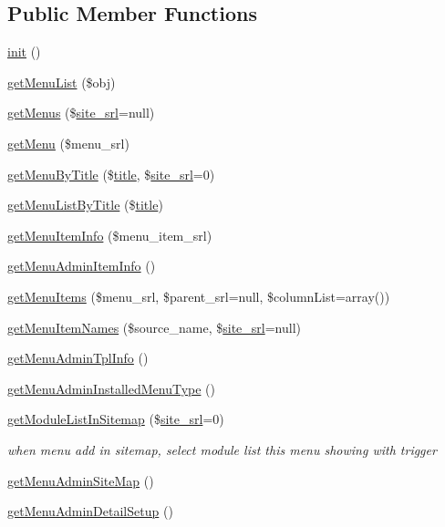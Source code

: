 \subsection*{Public Member Functions}
\begin{DoxyCompactItemize}
\item 
\hyperlink{classmenuAdminModel_a092a0da21ac0c7f76f84ec5be5eea1b7}{init} ()
\item 
\hyperlink{classmenuAdminModel_ad1a73e97dedf1b78f6780e4c17ff5100}{get\+Menu\+List} (\$obj)
\item 
\hyperlink{classmenuAdminModel_a78dfe866b68c04fd622df4d41bdce36c}{get\+Menus} (\$\hyperlink{ko_8install_8php_a8b1406b4ad1048041558dce6bfe89004}{site\+\_\+srl}=null)
\item 
\hyperlink{classmenuAdminModel_a303e32a7d98c99847035407e7ed4e951}{get\+Menu} (\$menu\+\_\+srl)
\item 
\hyperlink{classmenuAdminModel_a358509545ff88093b02be04c6599796d}{get\+Menu\+By\+Title} (\$\hyperlink{ko_8install_8php_a5b072c5fd1d2228c6ba5cee13cd142e3}{title}, \$\hyperlink{ko_8install_8php_a8b1406b4ad1048041558dce6bfe89004}{site\+\_\+srl}=0)
\item 
\hyperlink{classmenuAdminModel_a0639cb89b3292dc5ee8977423b5ac140}{get\+Menu\+List\+By\+Title} (\$\hyperlink{ko_8install_8php_a5b072c5fd1d2228c6ba5cee13cd142e3}{title})
\item 
\hyperlink{classmenuAdminModel_a5686120035966f9a44ec2fea2af191e4}{get\+Menu\+Item\+Info} (\$menu\+\_\+item\+\_\+srl)
\item 
\hyperlink{classmenuAdminModel_a12a02d8f3441f1454fe22e5b8d927de5}{get\+Menu\+Admin\+Item\+Info} ()
\item 
\hyperlink{classmenuAdminModel_a2a663607f4ded1cf71df28271ac72888}{get\+Menu\+Items} (\$menu\+\_\+srl, \$parent\+\_\+srl=null, \$column\+List=array())
\item 
\hyperlink{classmenuAdminModel_a3a77c5cfe6cee8b008b5b960adb83d9e}{get\+Menu\+Item\+Names} (\$source\+\_\+name, \$\hyperlink{ko_8install_8php_a8b1406b4ad1048041558dce6bfe89004}{site\+\_\+srl}=null)
\item 
\hyperlink{classmenuAdminModel_a9f938b72f1488559cab19e9011ae7076}{get\+Menu\+Admin\+Tpl\+Info} ()
\item 
\hyperlink{classmenuAdminModel_a1fd1ae309603a0fc0b58589d2cc0d025}{get\+Menu\+Admin\+Installed\+Menu\+Type} ()
\item 
\hyperlink{classmenuAdminModel_a20137764f7bc81d8413f7adc0518d895}{get\+Module\+List\+In\+Sitemap} (\$\hyperlink{ko_8install_8php_a8b1406b4ad1048041558dce6bfe89004}{site\+\_\+srl}=0)
\begin{DoxyCompactList}\small\item\em when menu add in sitemap, select module list this menu showing with trigger \end{DoxyCompactList}\item 
\hyperlink{classmenuAdminModel_adaae66f6de001bdaa33b72bcc83a6747}{get\+Menu\+Admin\+Site\+Map} ()
\item 
\hyperlink{classmenuAdminModel_ac55866233401318f5c9c2529a924c06b}{get\+Menu\+Admin\+Detail\+Setup} ()
\end{DoxyCompactItemize}
